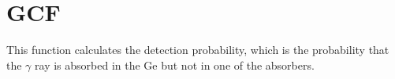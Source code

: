 \section{GCF}
\label{sect:gcf}

\noindent This function calculates the detection probability, which is the
probability that the $\gamma$ ray is absorbed in the Ge but not in one of
the absorbers.\\
